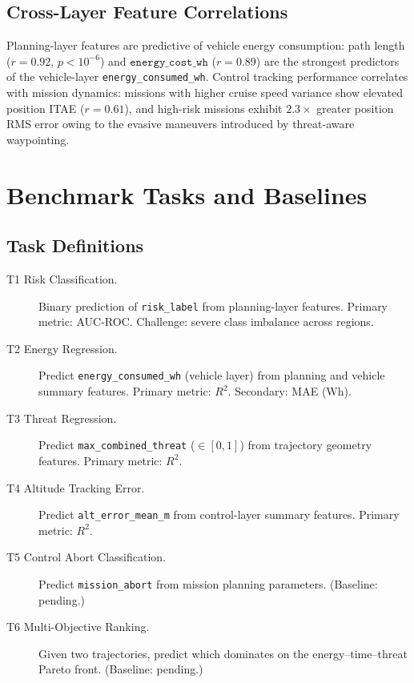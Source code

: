 \documentclass{article}
\begin{document}
\subsection{Cross-Layer Feature Correlations}

Planning-layer features are predictive of vehicle energy consumption:
path length ($r = 0.92$, $p < 10^{-6}$) and $\texttt{energy\_cost\_wh}$
($r = 0.89$) are the strongest predictors of the vehicle-layer
\texttt{energy\_consumed\_wh}.
Control tracking performance correlates with mission dynamics:
missions with higher cruise speed variance show elevated position ITAE
($r = 0.61$), and high-risk missions exhibit $2.3\times$ greater position
RMS error owing to the evasive maneuvers introduced by threat-aware waypointing.

\section{Benchmark Tasks and Baselines}
\label{sec:benchmarks}

\subsection{Task Definitions}

\begin{description}
  \item[T1 Risk Classification.] Binary prediction of \texttt{risk\_label}
    from planning-layer features. Primary metric: AUC-ROC.
    Challenge: severe class imbalance across regions.
  \item[T2 Energy Regression.] Predict \texttt{energy\_consumed\_wh}
    (vehicle layer) from planning and vehicle summary features.
    Primary metric: $R^2$. Secondary: MAE (Wh).
  \item[T3 Threat Regression.] Predict \texttt{max\_combined\_threat}
    ($\in [0,1]$) from trajectory geometry features.
    Primary metric: $R^2$.
  \item[T4 Altitude Tracking Error.] Predict \texttt{alt\_error\_mean\_m}
    from control-layer summary features. Primary metric: $R^2$.
  \item[T5 Control Abort Classification.] Predict \texttt{mission\_abort}
    from mission planning parameters. (Baseline: pending.)
  \item[T6 Multi-Objective Ranking.] Given two trajectories, predict
    which dominates on the energy--time--threat Pareto front.
    (Baseline: pending.)
\end{description}
\end{document}
